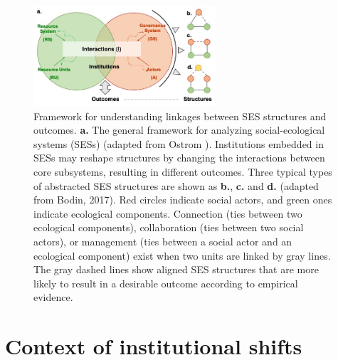 \documentclass{../nsr}
\begin{document}
\begin{figure}
	\centering
	\includegraphics[width=16pc]{diagrams/framework.jpg}
	\caption{
		Framework for understanding linkages between SES structures and outcomes.
		\textbf{a.} The general framework for analyzing social-ecological systems (SESs) (adapted from Ostrom \cite{ostromGeneralFrameworkAnalyzing2009}). Institutions embedded in SESs may reshape structures by changing the interactions between core subsystems, resulting in different outcomes.
        Three typical types of abstracted SES structures are shown as \textbf{b.}, \textbf{c.} and \textbf{d.} (adapted from Bodin, 2017)\cite{bodinCollaborativeenvironmentalgovernance2017}. Red circles indicate social actors, and green ones indicate ecological components. Connection (ties between two ecological components), collaboration (ties between two social actors), or management (ties between a social actor and an ecological component) exist when two units are linked by gray lines. The gray dashed lines show aligned SES structures that are more likely to result in a desirable outcome according to empirical evidence.
	}
    \label{fig:framework}
\end{figure}

\section{Context of institutional shifts}\label{institution}

\end{document}

